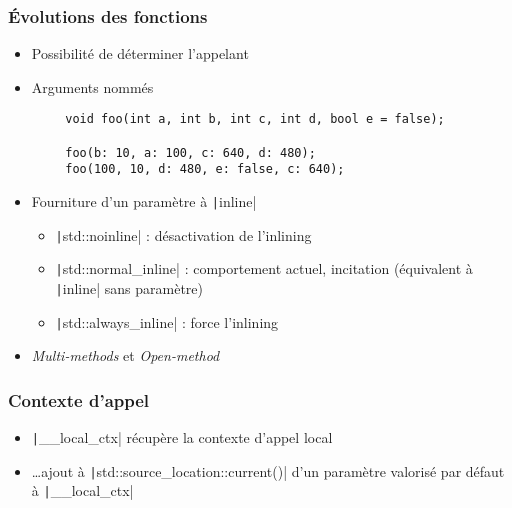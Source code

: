\documentclass[C++.tex]{subfiles}
\begin{document}
\begin{frame}[fragile]
	\frametitle{Évolutions des fonctions}
	\begin{itemize}
		\item Possibilité de déterminer l'appelant
		\item Arguments nommés
	\end{itemize}

	\begin{verbatim}
		void foo(int a, int b, int c, int d, bool e = false);

		foo(b: 10, a: 100, c: 640, d: 480);
		foo(100, 10, d: 480, e: false, c: 640);
	\end{verbatim}

	\begin{itemize}
		\item Fourniture d'un paramètre à \texttt|inline|
		\begin{itemize}
			\item \texttt|std::noinline| : désactivation de l'inlining
			\item \texttt|std::normal_inline| : comportement actuel, incitation (équivalent à \texttt|inline| sans paramètre)
			\item \texttt|std::always_inline| : force l'inlining
		\end{itemize}
		\item \textit{Multi-methods} et \textit{Open-method}
	\end{itemize}

\end{frame}

\begin{frame}[fragile]
	\frametitle{Contexte d'appel}
	\begin{itemize}
		\item \texttt|__local_ctx| récupère la contexte d'appel local
		\item \ldots ajout à \texttt|std::source_location::current()| d'un paramètre valorisé par défaut à \texttt|__local_ctx|


	\end{itemize}

\end{frame}
\end{document}

